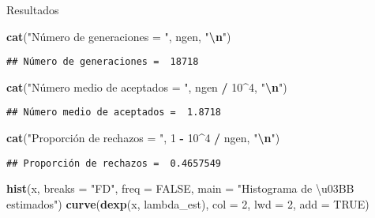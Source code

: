 \documentclass[
]{article}
\newenvironment{Shaded}{\begin{snugshade}}{\end{snugshade}}
\newcommand{\AttributeTok}[1]{\textcolor[rgb]{0.13,0.29,0.53}{#1}}
\newcommand{\ConstantTok}[1]{\textcolor[rgb]{0.56,0.35,0.01}{#1}}
\newcommand{\DecValTok}[1]{\textcolor[rgb]{0.00,0.00,0.81}{#1}}
\newcommand{\FunctionTok}[1]{\textcolor[rgb]{0.13,0.29,0.53}{\textbf{#1}}}
\newcommand{\NormalTok}[1]{#1}
\newcommand{\SpecialCharTok}[1]{\textcolor[rgb]{0.81,0.36,0.00}{\textbf{#1}}}
\newcommand{\StringTok}[1]{\textcolor[rgb]{0.31,0.60,0.02}{#1}}
\begin{document}
Resultados

\begin{Shaded}
\begin{Highlighting}[]
\FunctionTok{cat}\NormalTok{(}\StringTok{"Número de generaciones = "}\NormalTok{, ngen, }\StringTok{"}\SpecialCharTok{\textbackslash{}n}\StringTok{"}\NormalTok{)}
\end{Highlighting}
\end{Shaded}

\begin{verbatim}
## Número de generaciones =  18718
\end{verbatim}

\begin{Shaded}
\begin{Highlighting}[]
\FunctionTok{cat}\NormalTok{(}\StringTok{"Número medio de aceptados = "}\NormalTok{, ngen }\SpecialCharTok{/} \DecValTok{10}\SpecialCharTok{\^{}}\DecValTok{4}\NormalTok{, }\StringTok{"}\SpecialCharTok{\textbackslash{}n}\StringTok{"}\NormalTok{)}
\end{Highlighting}
\end{Shaded}

\begin{verbatim}
## Número medio de aceptados =  1.8718
\end{verbatim}

\begin{Shaded}
\begin{Highlighting}[]
\FunctionTok{cat}\NormalTok{(}\StringTok{"Proporción de rechazos = "}\NormalTok{, }\DecValTok{1} \SpecialCharTok{{-}} \DecValTok{10}\SpecialCharTok{\^{}}\DecValTok{4} \SpecialCharTok{/}\NormalTok{ ngen, }\StringTok{"}\SpecialCharTok{\textbackslash{}n}\StringTok{"}\NormalTok{)}
\end{Highlighting}
\end{Shaded}

\begin{verbatim}
## Proporción de rechazos =  0.4657549
\end{verbatim}

\begin{Shaded}
\begin{Highlighting}[]
\FunctionTok{hist}\NormalTok{(x, }\AttributeTok{breaks =} \StringTok{"FD"}\NormalTok{, }\AttributeTok{freq =} \ConstantTok{FALSE}\NormalTok{, }\AttributeTok{main =} \StringTok{"Histograma de \textbackslash{}u03BB estimados"}\NormalTok{)}
\FunctionTok{curve}\NormalTok{(}\FunctionTok{dexp}\NormalTok{(x, lambda\_est), }\AttributeTok{col =} \DecValTok{2}\NormalTok{, }\AttributeTok{lwd =} \DecValTok{2}\NormalTok{, }\AttributeTok{add =} \ConstantTok{TRUE}\NormalTok{)}
\end{Highlighting}
\end{Shaded}
\end{document}
